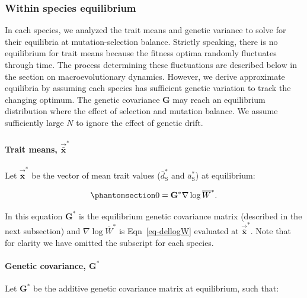 \documentclass[
  letterpaper,
  DIV=11,
  numbers=noendperiod]{scrartcl}
\let\oldparagraph\paragraph
\renewcommand{\paragraph}[1]{\oldparagraph{#1}\mbox{}}
\begin{document}
\subsubsection{Within species
equilibrium}\label{within-species-equilibrium}

In each species, we analyzed the trait means and genetic variance to
solve for their equilibria at mutation-selection balance. Strictly
speaking, there is no equilibrium for trait means because the fitness
optima randomly fluctuates through time. The process determining these
fluctuations are described below in the section on macroevolutionary
dynamics. However, we derive approximate equilibria by assuming each
species has sufficient genetic variation to track the changing optimum.
The genetic covariance \(\mathbf{G}\) may reach an equilibrium
distribution where the effect of selection and mutation balance. We
assume sufficiently large \(N\) to ignore the effect of genetic drift.

\paragraph{\texorpdfstring{Trait means,
\(\vec{\bar{\mathbf{x}}}^*\)}{Trait means, \textbackslash vec\{\textbackslash bar\{\textbackslash mathbf\{x\}\}\}\^{}*}}\label{trait-means-vecbarmathbfx}

Let \(\vec{\bar{\mathbf{x}}}^*\) be the vector of mean trait values
(\(\bar{d}^*_\mathrm{S}\) and \(\bar{a}^*_\mathrm{S}\)) at equilibrium:

\begin{equation}\phantomsection\label{eq-dxbarstar}{0 = \mathbf{G}^* \nabla \log \overline{W}^*.}\end{equation}

In this equation \(\mathbf{G}^*\) is the equilibrium genetic covariance
matrix (described in the next subsection) and
\(\nabla \log \overline{W}^*\) is Eqn~\ref{eq-dellogW} evaluated at
\(\vec{\bar{\mathbf{x}}}^*\). Note that for clarity we have omitted the
subscript for each species.

\paragraph{\texorpdfstring{Genetic covariance,
\(\mathbf{G}^*\)}{Genetic covariance, \textbackslash mathbf\{G\}\^{}*}}\label{genetic-covariance-mathbfg}

Let \(\mathbf{G}^*\) be the additive genetic covariance matrix at
equilibrium, such that:
\end{document}
